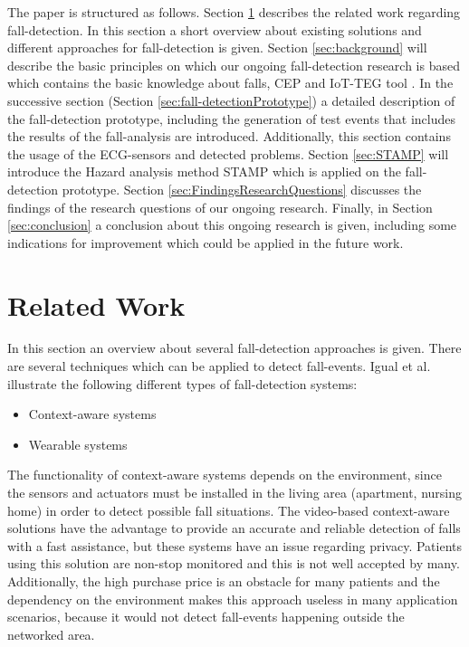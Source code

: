 \documentclass[review]{elsarticle}
\begin{document}
The paper is structured as follows. Section \ref{sec:relatedwork} describes the related work regarding fall-detection. In this section a short overview about existing solutions and different approaches for fall-detection is given. Section \ref{sec:background} will describe the basic principles on which our ongoing fall-detection research is based which contains the basic knowledge about falls, CEP \cite{Esper:2016} and IoT-TEG tool \cite{Gutierrez2017, TesisGutierrez2017}. In the successive section (Section \ref{sec:fall-detectionPrototype}) a detailed description of the fall-detection prototype, including the generation of test events that includes the results of the fall-analysis are introduced. Additionally, this section contains the usage of the ECG-sensors and detected problems. Section \ref{sec:STAMP} will introduce the Hazard analysis method STAMP \cite{leveson2011engineering} which is applied on the fall-detection prototype. Section \ref{sec:FindingsResearchQuestions} discusses the findings of the research questions of our ongoing research. Finally, in Section \ref{sec:conclusion} a conclusion about this ongoing research is given, including some indications for improvement which could be applied in the future work.

\section{Related Work}
\label{sec:relatedwork}
In this section an overview about several fall-detection approaches is given. There are several techniques which can be applied to detect fall-events. Igual et al. \cite{Igual2013} illustrate the following different types of fall-detection  systems:
\begin{itemize}
	\item Context-aware systems
	\item Wearable systems
\end{itemize}
The functionality of context-aware systems depends on the environment, since the sensors and actuators must be installed in the living area (apartment, nursing home) in order to detect possible fall situations. The video-based context-aware solutions have the advantage to provide an accurate and reliable detection of falls with a fast assistance, but these systems have an issue regarding privacy. Patients using this solution are non-stop monitored and this is not well accepted by many. Additionally, the high purchase price is an obstacle for many patients and the dependency on the environment makes this approach useless in many application scenarios, because it would not detect fall-events happening outside the networked area.
\end{document}
